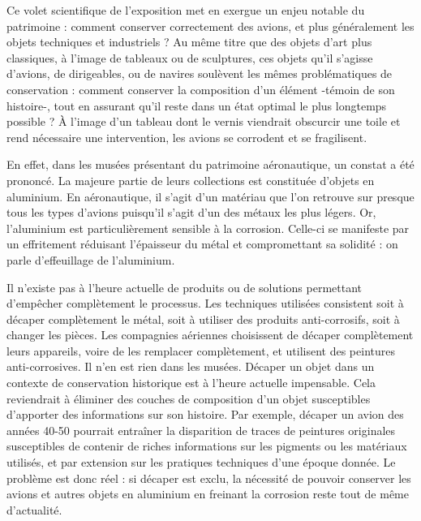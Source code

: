 \documentclass[a4paper,12pt,twoside]{book}
\begin{document}
Ce volet scientifique de l'exposition met en exergue un enjeu notable du patrimoine : comment conserver correctement des avions, et plus généralement les objets techniques et industriels ? Au même titre que des objets d'art plus classiques, à l'image de tableaux ou de sculptures, ces objets qu’il s’agisse d’avions, de dirigeables, ou de navires soulèvent les mêmes problématiques de conservation : comment conserver la composition d'un élément -témoin de son histoire-, tout en assurant qu'il reste dans un état optimal le plus longtemps possible ? À l'image d'un tableau dont le vernis viendrait obscurcir une toile et rend nécessaire une intervention, les avions se corrodent et se fragilisent.

En effet, dans les musées présentant du patrimoine aéronautique, un constat a été prononcé. La majeure partie de leurs collections est constituée d'objets en aluminium. En aéronautique, il s'agit d'un matériau que l'on retrouve sur presque tous les types d'avions puisqu'il s’agit d’un des métaux les plus légers. Or, l’aluminium est particulièrement sensible à la corrosion. Celle-ci se manifeste par un effritement réduisant l'épaisseur du métal et compromettant sa solidité : on parle d'effeuillage de l'aluminium.

Il n'existe pas à l'heure actuelle de produits ou de solutions permettant d'empêcher complètement le processus. Les techniques utilisées consistent soit à décaper complètement le métal, soit à utiliser des produits anti-corrosifs, soit à changer les pièces. Les compagnies aériennes choisissent de décaper complètement leurs appareils, voire de les remplacer complètement, et utilisent des peintures anti-corrosives. Il n'en est rien dans les musées. Décaper un objet dans un contexte de conservation historique est à l'heure actuelle impensable. Cela reviendrait à éliminer des couches de composition d'un objet susceptibles d'apporter des informations sur son histoire. Par exemple, décaper un avion des années 40-50 pourrait entraîner la disparition de traces de peintures originales susceptibles de contenir de riches informations sur les pigments ou les matériaux utilisés, et par extension sur les pratiques techniques d’une époque donnée. Le problème est donc réel : si décaper est exclu, la nécessité de pouvoir conserver les avions et autres objets en aluminium en freinant la corrosion reste tout de même d'actualité.
\end{document}
